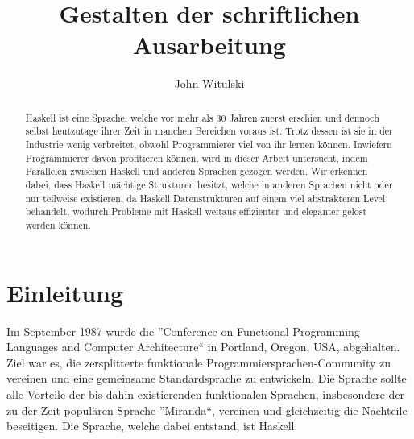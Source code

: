 \documentclass{hhuarticle}
\title{Gestalten der schriftlichen Ausarbeitung}
\author{John Witulski} %
\theoremstyle{definition}
\theoremstyle{theorem}
\begin{document}
  \maketitle

  \begin{abstract}
    Haskell ist eine Sprache, welche vor mehr als 30 Jahren zuerst erschien
    und dennoch selbst heutzutage ihrer Zeit in manchen Bereichen voraus ist.
    Trotz dessen ist sie in der Industrie wenig verbreitet, obwohl
    Programmierer viel von ihr lernen können.
    Inwiefern Programmierer davon profitieren können,
    wird in dieser Arbeit untersucht, indem
    Parallelen zwischen Haskell und anderen Sprachen gezogen werden.
    Wir erkennen dabei, dass Haskell mächtige Strukturen besitzt, welche
    in anderen Sprachen nicht oder nur teilweise existieren, da Haskell
    Datenstrukturen auf einem viel abstrakteren Level behandelt,
    wodurch Probleme mit Haskell weitaus effizienter und eleganter
    gelöst werden können.
  \end{abstract}

\tableofcontents


  \section{Einleitung}

  Im September 1987 wurde die
  ''Conference on Functional Programming Languages and Computer Architecture``
  in Portland, Oregon, USA, abgehalten. Ziel war es, die zersplitterte
  funktionale Programmiersprachen-Community zu vereinen und eine
  gemeinsame Standardsprache zu entwickeln.
  Die Sprache sollte alle Vorteile der bis dahin existierenden
  funktionalen Sprachen, insbesondere der zu der Zeit populären Sprache
  ''Miranda``, vereinen und gleichzeitig die Nachteile beseitigen.
  Die Sprache, welche dabei entstand, ist Haskell.
\end{document}
